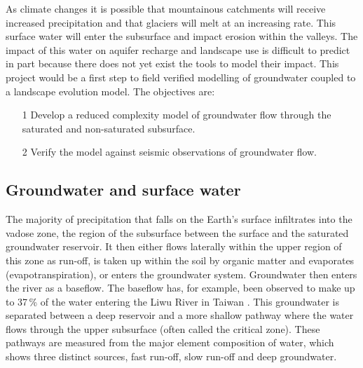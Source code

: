 As climate changes it is possible that mountainous catchments will receive increased precipitation and that glaciers will melt at an increasing rate. This surface water will enter the subsurface and impact erosion within the valleys. The impact of this water on aquifer recharge and landscape use is difficult to predict in part because there does not yet exist the tools to model their impact. This project would be a first step to field verified modelling of groundwater coupled to a landscape evolution model. The objectives are:
\begin{itemize}
    \item[1] Develop a reduced complexity model of groundwater flow through the saturated and non-saturated subsurface.
    \item[2] Verify the model against seismic observations of groundwater flow.
\end{itemize}

\subsection{Groundwater and surface water}

The majority of precipitation that falls on the Earth’s surface infiltrates into the vadose zone, the region of the subsurface between the surface and the saturated groundwater reservoir. It then either flows laterally within the upper region of this zone as run-off, is taken up within the soil by organic matter and evaporates (evapotranspiration), or enters the groundwater system. Groundwater then enters the river as a baseflow. The baseflow has, for example, been observed to make up to 37\,\% of the water entering the Liwu River in Taiwan \citep{calmels-etal-2011}. This groundwater is separated between a deep reservoir and a more shallow pathway where the water flows through the upper subsurface (often called the critical zone). These pathways are measured from the major element composition of water, which shows three distinct sources, fast run-off, slow run-off and deep groundwater.

